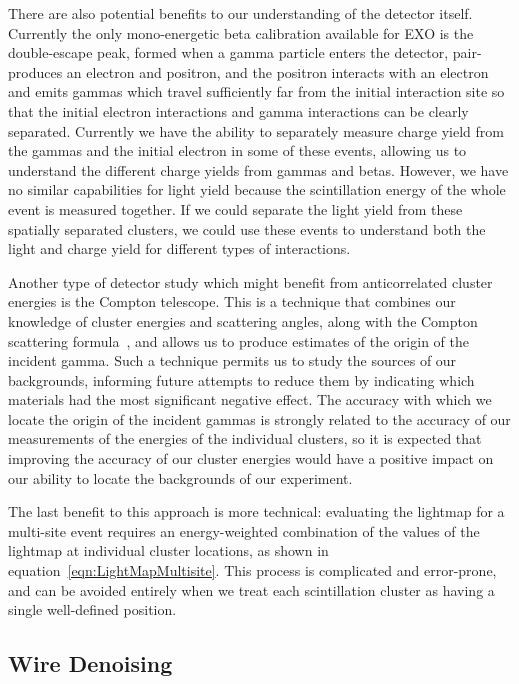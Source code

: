 There are also potential benefits to our understanding of the detector itself.  Currently the only mono-energetic beta calibration available for EXO is the double-escape peak, formed when a gamma particle enters the detector, pair-produces an electron and positron, and the positron interacts with an electron and emits gammas which travel sufficiently far from the initial interaction site so that the initial electron interactions and gamma interactions can be clearly separated.  Currently we have the ability to separately measure charge yield from the gammas and the initial electron in some of these events, allowing us to understand the different charge yields from gammas and betas.  However, we have no similar capabilities for light yield because the scintillation energy of the whole event is measured together.  If we could separate the light yield from these spatially separated clusters, we could use these events to understand both the light and charge yield for different types of interactions.

Another type of detector study which might benefit from anticorrelated cluster energies is the Compton telescope.  This is a technique that combines our knowledge of cluster energies and scattering angles, along with the Compton scattering formula~\cite{ComptonScattering}, and allows us to produce estimates of the origin of the incident gamma.  Such a technique permits us to study the sources of our backgrounds, informing future attempts to reduce them by indicating which materials had the most significant negative effect.  The accuracy with which we locate the origin of the incident gammas is strongly related to the accuracy of our measurements of the energies of the individual clusters, so it is expected that improving the accuracy of our cluster energies would have a positive impact on our ability to locate the backgrounds of our experiment.

The last benefit to this approach is more technical: evaluating the lightmap for a multi-site event requires an energy-weighted combination of the values of the lightmap at individual cluster locations, as shown in equation~\ref{eqn:LightMapMultisite}.  This process is complicated and error-prone, and can be avoided entirely when we treat each scintillation cluster as having a single well-defined position.

\subsection{Wire Denoising}

